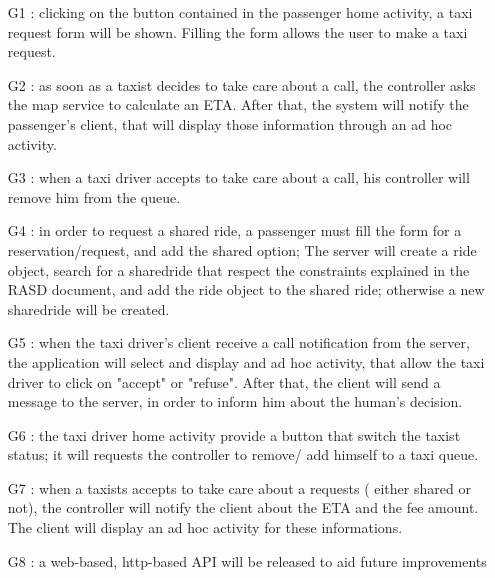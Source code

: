 
\begin{itemize}
 \item[G1]: clicking on the button contained in the passenger home activity, a taxi request form will be shown. 
  Filling the form allows the user to make a taxi request.
 \item[G2]: as soon as a taxist decides to take care about a call, the controller asks the map service to calculate an ETA. 
 After that, the system will notify the passenger's client, that will display those information through an ad hoc activity.
 \item[G3]: when a taxi driver accepts to take care about a call, his controller will remove him from the queue.
 \item[G4]: in order to request a shared ride, a passenger must fill the form for a reservation/request, and add the shared option;
 The server will create a ride object, search for a sharedride that respect the constraints explained in the RASD document,
 and add the ride object to the shared ride; otherwise a new sharedride will be created.
 \item[G5]: when the taxi driver's client receive a call notification from the server, the application will select and display 
 and ad hoc activity, that allow the taxi driver to click on "accept" or "refuse". After that, the client will send a message to the
 server, in order to inform him about the human's decision.
 \item[G6]: the taxi driver home activity provide a button that switch the taxist status; it will requests the controller to 
 remove/ add himself to a taxi queue.
 \item[G7]: when a taxists accepts to take care about a requests ( either shared or not), the controller will notify the client about
 the ETA and the fee amount. The client will display an ad hoc activity for these informations. 
 \item[G8]: a web-based, http-based API will be released to aid future improvements
\end{itemize}

